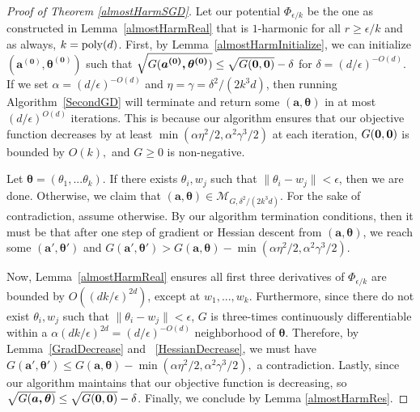 \begin{proof}[Proof of Theorem \ref{almostHarmSGD}]
  Let our potential $\Phi_{\epsilon/k}$ be the one as constructed in Lemma~\ref{almostHarmReal} that is $1$-harmonic for all $r \geq \epsilon/k$ and as always, $k = \mathrm{poly}(d)$.  First, by Lemma~\ref{almostHarmInitialize}, we can initialize $\boldsymbol{(a^{(0)},\theta^{(0)})}$ such that $\sqrt{G(\boldsymbol{a^{(0)},\theta^{(0)}})} \leq \sqrt{G({\bf 0,0})} - \delta$ for $\delta = (d/\epsilon)^{-O(d)}$. If we set $\alpha = (d/\epsilon)^{-O(d)}$ and $\eta = \gamma = \delta^2/(2k^3d)$, then running Algorithm~\ref{SecondGD} will terminate and return some $(\boldsymbol{a,\theta})$ in at most $(d/\epsilon)^{O(d)}$ iterations. This is because our algorithm ensures that our objective function decreases by at least $\min(\alpha \eta^2/2, \alpha^2\gamma^3/2)$ at each iteration, $G({\bf 0, 0})$ is bounded by $O(k),$ and $G \geq 0$ is non-negative.

Let $\boldsymbol{\theta} = (\theta_1,...\theta_k)$. If there exists $\theta_i, w_j$ such that $\|\theta_i - w_j\| < \epsilon$, then we are done. Otherwise, we claim that $(\boldsymbol{a,\theta}) \in \mathcal{M}_{G, \delta^2/(2k^3d)}$. For the sake of contradiction, assume otherwise. By our algorithm termination conditions, then it must be that after one step of gradient or Hessian descent from $(\boldsymbol{a,\theta})$, we reach some $(\boldsymbol{a',\theta'})$ and $G(\boldsymbol{a',\theta'}) > G(\boldsymbol{a,\theta}) - \min(\alpha\eta^2/2,\alpha^2\gamma^3/2)$.

Now, Lemma~\ref{almostHarmReal} ensures all first three derivatives of
$\Phi_{\epsilon/k}$ are bounded by $O((dk/\epsilon)^{2d})$, except at
$w_1,...,w_k$. Furthermore, since there do not exist
$\theta_i, w_j$ such that $\|\theta_i - w_j\| <\epsilon$, $G$ is
three-times continuously differentiable within a
$\alpha (dk/\epsilon)^{2d} = (d/\epsilon)^{-O(d)}$ neighborhood of
$\boldsymbol{\theta}$. Therefore, by Lemma~\ref{GradDecrease} and
~\ref{HessianDecrease}, we must have
$G(\boldsymbol{a',\theta'}) \leq G(\boldsymbol{a,\theta}) -
\min(\alpha\eta^2/2,\alpha^2\gamma^3/2),$ a contradiction. Lastly,
since our algorithm maintains that our objective function is
decreasing, so
$\sqrt{G(\boldsymbol{a,\theta})} \leq \sqrt{G({\bf 0,0})} -
\delta$. Finally, we conclude by Lemma \ref{almostHarmRes}.
\end{proof}

